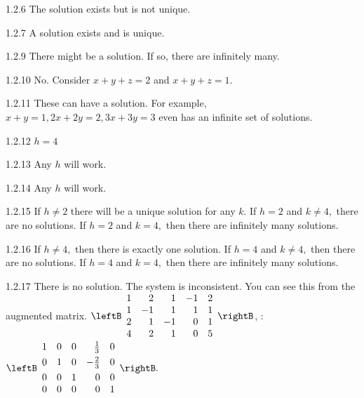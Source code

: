 \begin{Answer}{1.2.6}
The solution exists but is not unique.
\end{Answer}
\begin{Answer}{1.2.7}
A solution exists and is unique.
\end{Answer}
\begin{Answer}{1.2.9}
There might be a solution. If so, there are infinitely many.
\end{Answer}
\begin{Answer}{1.2.10}
No. Consider $x+y+z=2$ and $x+y+z=1.$
\end{Answer}
\begin{Answer}{1.2.11}
These can
have a solution. For example, $x+y=1,2x+2y=2,3x+3y=3$ even has an infinite
set of solutions.
\end{Answer}
\begin{Answer}{1.2.12}
$h=4$
\end{Answer}
\begin{Answer}{1.2.13}
 Any $h$ will work.
\end{Answer}
\begin{Answer}{1.2.14}
 Any $h$ will work.
\end{Answer}
\begin{Answer}{1.2.15}
If $h\neq 2$ there will be a unique solution for any $k$. If $h=2$ and $%
k\neq 4,$ there are no solutions. If $h=2$ and $k=4,$ then there are
infinitely many solutions.
\end{Answer}
\begin{Answer}{1.2.16}
If $h\neq 4,$ then there is exactly one solution. If $h=4$ and $k\neq 4,$
then there are no solutions. If $h=4$ and $k=4,$ then there are infinitely
many solutions.
\end{Answer}
\begin{Answer}{1.2.17}
There is no solution. The system is inconsistent. You can see this from the
augmented matrix. $\leftB
\begin{array}{rrrrr}
1 & 2 & 1 & -1 & 2 \\
1 & -1 & 1 & 1 & 1 \\
2 & 1 & -1 & 0 & 1 \\
4 & 2 & 1 & 0 & 5
\end{array}
\rightB $, \rref: $\leftB
\begin{array}{rrrrr}
1 & 0 & 0 & \vspace{0.05in}\frac{1}{3} & 0 \\
0 & 1 & 0 & -\vspace{0.05in}\frac{2}{3} & 0 \\
0 & 0 & 1 & 0 & 0 \\
0 & 0 & 0 & 0 & 1
\end{array}
\rightB .$
\end{Answer}
